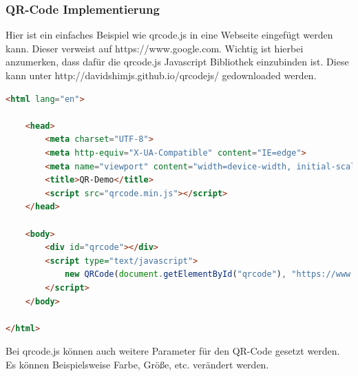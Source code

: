 \subsubsection{QR-Code Implementierung}
Hier ist ein einfaches Beispiel wie qrcode.js in eine Webseite eingefügt werden kann.
Dieser verweist auf https://www.google.com. Wichtig ist hierbei anzumerken, dass dafür die qrcode.js Javascript Bibliothek einzubinden ist.
Diese kann unter http://davidshimjs.github.io/qrcodejs/ gedownloaded werden. \cite{qrCode.js}
\begin{lstlisting}[language=html,caption=QR-Code Demo,label=lst:tech:gaussianBlur]
<html lang="en">

    <head>
        <meta charset="UTF-8">
        <meta http-equiv="X-UA-Compatible" content="IE=edge">
        <meta name="viewport" content="width=device-width, initial-scale=1.0">
        <title>QR-Demo</title>
        <script src="qrcode.min.js"></script>
    </head>
    
    <body>
        <div id="qrcode"></div>
        <script type="text/javascript">
            new QRCode(document.getElementById("qrcode"), "https://www.google.com");
        </script>
    </body>
    
</html>
\end{lstlisting}

Bei qrcode.js können auch weitere Parameter für den QR-Code gesetzt werden. Es können
Beispielsweise Farbe, Größe, etc. verändert werden.


